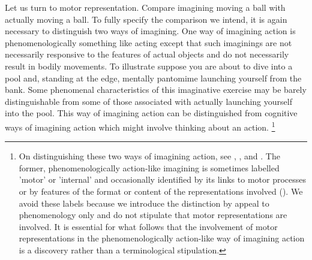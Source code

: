 \documentclass[12pt,\papersize]{extarticle}
\begin{document}
Let us turn to motor representation. Compare imagining moving a ball with actually moving a ball.  To fully specify the comparison we intend, it is again necessary to distinguish two ways of imagining. One way of imagining action is phenomenologically something like acting except that such imaginings are not necessarily responsive to the features of actual objects and do not necessarily result in bodily movements. To illustrate suppose you are about to dive into a pool and, standing at the edge, mentally pantomime launching yourself from the bank. Some phenomenal characteristics of this imaginative exercise may be barely distinguishable from some of those associated with actually launching yourself into the pool. This way of imagining action can be distinguished from cognitive ways of imagining action which might involve thinking about an action.%
\footnote{
On distinguishing these two ways of imagining action, see \citet[p.\ 161]{currie:1997_mental}, \citet[p.\ 727]{jeannerod:1995_mental}, and \citet[p.\ 638-9]{kosslyn:2001_neural}. The former, phenomenologically action-like imagining is sometimes labelled 'motor' or 'internal' and occasionally identified by its links to motor processes or by features of the format or content of the representations involved (\citealp[p.\ 1400]{annett:1995_motor}). We avoid these labels because we introduce the distinction by appeal to phenomenology only and do not stipulate that motor representations are involved. It is essential for what follows that the involvement of motor representations in the phenomenologically action-like way of imagining action is a discovery rather than a terminological stipulation.}
%
\end{document}
